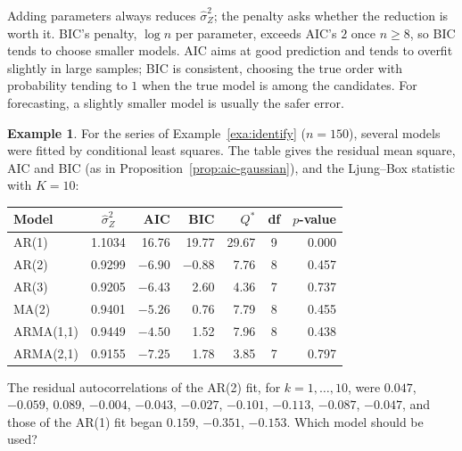 \documentclass[11pt,a4paper]{article}
\theoremstyle{definition}
\newtheorem{exa}[thm]{Example}
\begin{document}
Adding parameters always reduces $\hat\sigma_Z^2$; the penalty asks whether the reduction is worth it. BIC's penalty, $\log n$ per
parameter, exceeds AIC's $2$ once $n \ge 8$, so BIC tends to choose smaller models. AIC aims at good prediction and
tends to overfit slightly in large samples; BIC is consistent, choosing the true order with probability tending to
$1$ when the true model is among the candidates. For forecasting, a slightly smaller model is usually the
safer error.

\begin{exa}\label{exa:diagnostics}
For the series of Example~\ref{exa:identify} ($n = 150$), several models were fitted by conditional least squares. The table gives
the residual mean square, AIC and BIC (as in Proposition~\ref{prop:aic-gaussian}), and the Ljung--Box statistic with $K = 10$:
\begin{center}
\begin{tabular}{lcrrrcr}
Model & $\hat\sigma_Z^2$ & AIC & BIC & $Q^*$ & df & $p$-value \\
\hline
AR(1) & 1.1034 & 16.76 & 19.77 & 29.67 & 9 & 0.000 \\
AR(2) & 0.9299 & $-6.90$ & $-0.88$ & 7.76 & 8 & 0.457 \\
AR(3) & 0.9205 & $-6.43$ & 2.60 & 4.36 & 7 & 0.737 \\
MA(2) & 0.9401 & $-5.26$ & 0.76 & 7.79 & 8 & 0.455 \\
ARMA(1,1) & 0.9449 & $-4.50$ & 1.52 & 7.96 & 8 & 0.438 \\
ARMA(2,1) & 0.9155 & $-7.25$ & 1.78 & 3.85 & 7 & 0.797 \\
\end{tabular}
\end{center}
The residual autocorrelations of the AR(2) fit, for $k = 1, \dots, 10$, were
$0.047$, $-0.059$, $0.089$, $-0.004$, $-0.043$, $-0.027$, $-0.101$, $-0.113$, $-0.087$, $-0.047$, and those of the AR(1) fit began $0.159$, $-0.351$, $-0.153$.
Which model should be used?
\end{exa}
\end{document}
